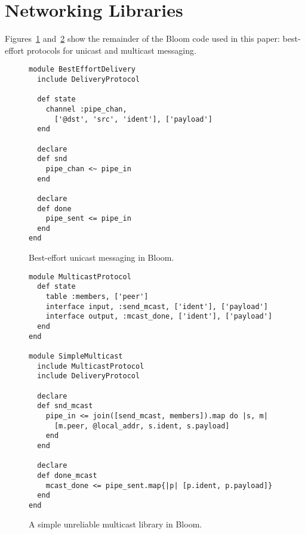 \section{Networking Libraries}
Figures~\ref{fig:delivery-impl} and~\ref{fig:multicast-impl} show the remainder
of the Bloom code used in this paper: best-effort protocols for unicast and
multicast messaging.

\label{app:network-code}

\begin{figure}[h]
\begin{scriptsize}
\begin{lstlisting}
module BestEffortDelivery
  include DeliveryProtocol

  def state
    channel :pipe_chan,
      ['@dst', 'src', 'ident'], ['payload']
  end

  declare
  def snd
    pipe_chan <~ pipe_in
  end

  declare
  def done
    pipe_sent <= pipe_in
  end
end
\end{lstlisting}
\centering
\vspace{-10pt}
\caption{Best-effort unicast messaging in Bloom.}
\label{fig:delivery-impl}
\end{scriptsize}
\vspace{-2pt}
\end{figure}


\begin{figure}[h]
\begin{scriptsize}
\begin{lstlisting}
module MulticastProtocol
  def state
    table :members, ['peer']
    interface input, :send_mcast, ['ident'], ['payload']
    interface output, :mcast_done, ['ident'], ['payload']
  end
end

module SimpleMulticast
  include MulticastProtocol
  include DeliveryProtocol

  declare
  def snd_mcast
    pipe_in <= join([send_mcast, members]).map do |s, m|
      [m.peer, @local_addr, s.ident, s.payload]
    end
  end

  declare
  def done_mcast
    mcast_done <= pipe_sent.map{|p| [p.ident, p.payload]}
  end
end
\end{lstlisting}
\centering
\vspace{-10pt}
\caption{A simple unreliable multicast library in Bloom.}
\label{fig:multicast-impl}
\end{scriptsize}
\vspace{-2pt}
\end{figure}
